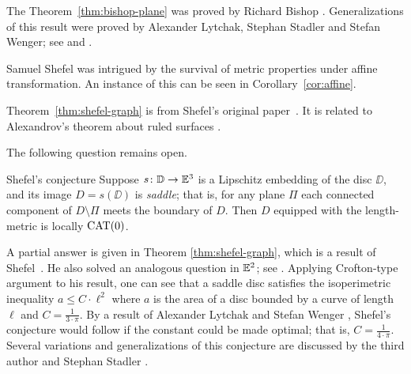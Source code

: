 The Theorem~\ref{thm:bishop-plane} was proved by Richard Bishop \cite{bishop}.
Generalizations of this result were proved by Alexander Lytchak, Stephan Stadler and Stefan Wenger; see \cite{lytchak-stadler} and \cite[Proposition 12.1]{lytchak-wenger}.

Samuel Shefel was intrigued by the survival of metric properties under affine transformation.
An instance of this can be seen in Corollary~\ref{cor:affine}.

Theorem~\ref{thm:shefel-graph} is from Shefel's original paper~\cite{shefel-1965}.
It is related to Alexandrov's theorem about ruled surfaces \cite{alexandrov-1957-ruled-surfaces}.

The following question remains open.

\begin{thm}{Shefel's conjecture}
Suppose $s\colon\mathbb{D} \to\mathbb{E}^3$ is a Lipschitz embedding of the disc $\DD$,
and its image $D=s(\DD)$ is \emph{saddle}; that is, for any plane $\Pi$ each connected component of $D\setminus \Pi$ meets the boundary of $D$.
Then $D$ equipped with the length-metric is locally $\mathrm{CAT}(0)$.
\end{thm}

A partial answer is given in Theorem \ref{thm:shefel-graph},
which is a result of Shefel~\cite{shefel-1964}.
He also solved an analogous question in $\mathbb{E}^2$; see \cite{shefel-1965}.
Applying Crofton-type argument to his result, one can see that a saddle disc satisfies the isoperimetric inequality $a\le C\cdot \ell^2$
where $a$ is the area of a disc bounded by a curve of length $\ell$ and $C=\tfrac{1}{3\cdot\pi}$.
By a result of Alexander Lytchak and Stefan Wenger \cite{lytchak-wenger}, Shefel's conjecture would follow if the constant could be made optimal; that is, $C=\tfrac{1}{4\cdot\pi}$.
Several variations and generalizations of this conjecture are discussed by the third author and Stephan Stadler \cite{petrunin-stadler}.
